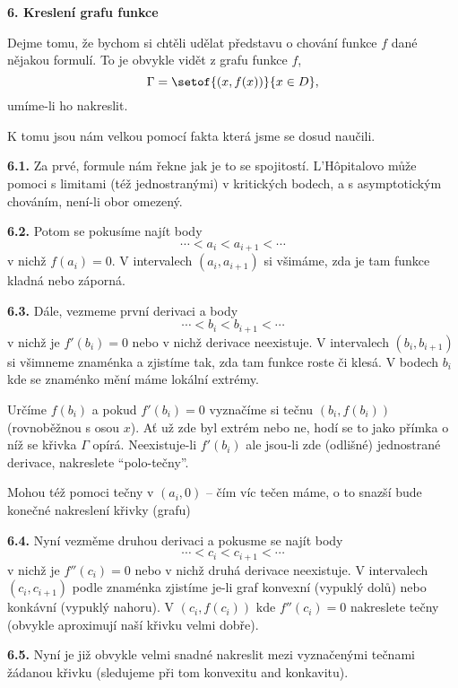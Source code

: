 \documentclass[12pt]{article}
\begin{document}
{ \vskip10mm
 
 {\large\bf 6. Kreslení grafu funkce}
 
 \bigskip
 
  Dejme tomu, že bychom si chtěli udělat představu o chování funkce $f$ dané nějakou formulí. To je obvykle vidět z grafu funkce $f$,
 $$
 \Gamma=\setof{(x,f(x))}{x\in D},
 $$
 umíme-li ho nakreslit.
 
 K tomu jsou nám velkou pomocí fakta která jsme se dosud naučili. 
 
 \bigskip
  
 {\bf 6.1.} Za prvé, formule nám řekne jak je to se spojitostí. L'H\^{o}pitalovo může pomoci s limitami (též jednostranými) v kritických bodech, a s asymptotickým chováním, není-li obor omezený.
 
 \bigskip
 
 {\bf 6.2.} Potom se pokusíme najít body 
 $$
 \cdots<a_i<a_{i+1}<\cdots
 $$
 v nichž $f(a_i)=0$. V intervalech $(a_i,a_{i+1})$ si všimáme, zda je tam funkce kladná nebo záporná.
 
 \bigskip
 
 {\bf 6.3.} Dále, vezmeme první derivaci a body
 $$
 \cdots<b_i<b_{i+1}<\cdots
 $$
v nichž je $f'(b_i)=0$ nebo v nichž derivace neexistuje. V intervalech $(b_i,b_{i+1})$ si všimneme znaménka a zjistíme tak, zda tam funkce roste či klesá. V bodech $b_i$ kde se znaménko mění máme lokální extrémy.
 
 Určíme $f(b_i)$ a pokud $f'(b_i)=0$ vyznačíme si tečnu $(b_i,f(b_i))$ (rovnoběžnou s osou $x$). Ať už zde byl extrém nebo ne, hodí se to jako přímka o níž se křivka $\Gamma$ opírá. Neexistuje-li $f'(b_i)$ ale jsou-li zde (odlišné) jednostrané derivace, nakreslete ``polo-tečny''.

 Mohou též pomoci tečny v $(a_i,0)$ -- čím víc tečen máme, o to snazší bude konečné nakreslení křivky (grafu) 
 
 \bigskip
 
 {\bf 6.4.} Nyní vezměme druhou derivaci a pokusme se najít body
 $$
 \cdots<c_i<c_{i+1}<\cdots
 $$
 v nichž je $f''(c_i)=0$ nebo v nichž druhá derivace neexistuje. V intervalech $(c_i,c_{i+1})$ podle znaménka zjistíme je-li graf konvexní
 (vypuklý dolů) nebo konkávní (vypuklý nahoru). V $(c_i,f(c_i))$ kde $f''(c_i)=0$ nakreslete tečny (obvykle aproximují naší křivku velmi dobře).
 
 \bigskip
 
 {\bf 6.5.} Nyní je již obvykle velmi snadné nakreslit mezi vyznačenými tečnami žádanou křivku (sledujeme při tom konvexitu and konkavitu).
 
}
\end{document}
